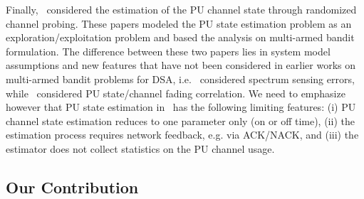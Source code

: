 \documentclass[11pt,draftclsnofoot,journal,onecolumn]{IEEEtran}
\begin{document}
Finally,~\cite{liu_twc_2012,wang_arxiv_2012} considered the estimation of the PU channel state through randomized channel probing. These papers modeled the PU state estimation problem as an exploration/exploitation problem and based the analysis on multi-armed bandit formulation. The difference between these two papers lies in system model assumptions and new features that have not been considered in earlier works on multi-armed bandit problems for DSA, i.e.~\cite{liu_twc_2012} considered spectrum sensing errors, while~\cite{wang_arxiv_2012} considered PU state/channel fading correlation. We need to emphasize however that PU state estimation in~\cite{liu_twc_2012,wang_arxiv_2012} has the following limiting features: (i) PU channel state estimation reduces to one parameter only (on or off time), (ii) the estimation process requires network feedback, e.g. via ACK/NACK, and (iii) the estimator does not collect statistics on the PU channel usage.

\subsection{Our Contribution}
\label{sec:contribution}
\end{document}
